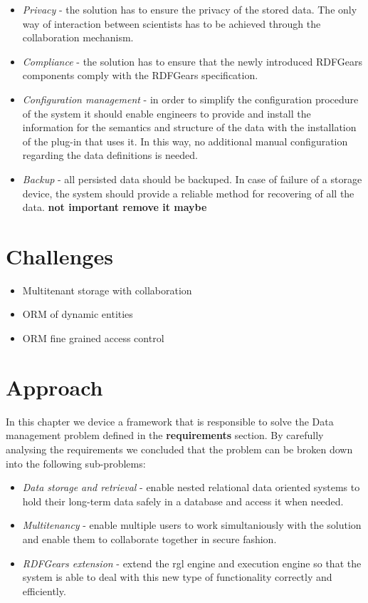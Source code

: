 \documentclass[a4paper, notitlepage]{article}
\begin{document}
\begin{itemize}
	\item \textit{Privacy} - the solution has to ensure the privacy of the stored data. The only way of interaction between scientists has to be achieved through the collaboration mechanism.
	
	\item \textit{Compliance} - the solution has to ensure that the newly introduced RDFGears components comply with the RDFGears specification. 
	
	\item \textit{Configuration management} - in order to simplify the configuration procedure of the system it should enable engineers to provide and install the information for the semantics and structure of the data with the installation of the plug-in that uses it. In this way, no additional manual configuration regarding the data definitions is needed.
	
	\item \textit{Backup} - all persisted data should be backuped. In case of failure of a storage device, the system should provide a reliable method for recovering of all the data. 
	\textbf{not important remove it maybe}
	
\end{itemize}

\section{Challenges}

\begin{itemize}
	\item Multitenant storage with collaboration
	\item ORM of dynamic entities
	\item ORM fine grained access control
\end{itemize}

\section{Approach}
In this chapter we device a framework that is responsible to solve the Data management problem defined in the \textbf{requirements} section. By carefully analysing the requirements we concluded that the problem can be broken down into the following sub-problems:
\begin{itemize}
	\item \textit{Data storage and retrieval} - enable nested relational data oriented systems to hold their long-term data safely in a database and access it when needed.
	\item \textit{Multitenancy} - enable multiple users to work simultaniously with the solution and enable them to collaborate together in secure fashion.
	\item \textit{RDFGears extension} - extend the rgl engine and execution engine so that the system is able to deal with this new type of functionality correctly and efficiently.
\end{itemize}
\end{document}
